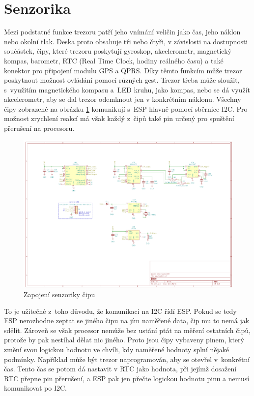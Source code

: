 \section{Senzorika}
Mezi podstatné funkce trezoru patří jeho vnímání veličin jako čas, jeho náklon nebo okolní tlak.
Deska proto obsahuje tři nebo čtyři, v závislosti na dostupnosti součástek, čipy, které trezoru poskytují gyroskop, akcelerometr, magnetický kompas,
barometr, RTC (Real Time Clock, hodiny reálného času) a také konektor pro připojení modulu GPS a QPRS. Díky těmto funkcím může trezor poskytnout možnost ovládání pomocí různých gest. 
Trezor třeba může sloužit, s~využitím magnetického kompasu a~LED kruhu, jako kompas, nebo se dá využít akcelerometr, 
aby se dal trezor odemknout jen v konkrétním náklonu. Všechny čipy zobrazené na obrázku \ref{fig:E4-sch_vnimani} komunikují s~ESP hlavně pomocí 
sběrnice I2C. Pro možnost zrychlení reakcí má však každý z~čipů také pin určený pro spuštění přerušení na procesoru. 

\begin{figure}[htbp] %
    \centering
    \includegraphics[width=\textwidth]{kapitoly/obrazky/E4/vnimani/sch.png}
    \caption{Zapojení senzoriky čipu}
    \label{fig:E4-sch_vnimani}
\end{figure}

\newpage

To je užitečné z~toho důvodu, že komunikaci na I2C řídí ESP. Pokud se tedy ESP nerozhodne zeptat se jiného čipu na jím naměřené data, čip mu to nemá 
jak sdělit. Zároveň se však procesor nemůže bez ustání ptát na měření ostatních čipů, protože by pak nestíhal dělat nic jiného. Proto jsou čipy vybaveny 
pinem, který změní svou logickou hodnotu ve chvíli, kdy naměřené hodnoty splní nějaké podmínky. 
Například může být trezor naprogramován, aby se otevřel 
v~konkrétní čas. Tento čas se potom dá nastavit v RTC jako hodnota, při jejímž dosažení RTC přepne pin přerušení, a ESP pak jen přečte logickou hodnotu 
pinu a nemusí komunikovat po I2C. %

